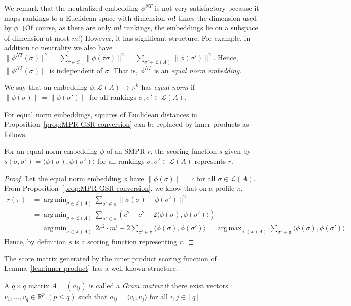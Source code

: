 \documentclass[prodmode]{acmsmall-ec14}
\newcommand{\calL}{{\mathcal{L}}}
\newcommand{\rank}{{\calL(A)}}
\DeclareMathOperator*{\argmax}{arg\,max}
\DeclareMathOperator*{\argmin}{arg\,min}
\newcommand{\nt}{NT}
\begin{document}
%
We remark that the neutralized embedding $\phi^{\nt}$ is not very satisfactory because it maps rankings to a Euclidean space with dimension $m!$ times the dimension used by $\phi$. (Of course, as there are only $m!$ rankings, the embeddings lie on a subspace of dimension at most $m!$)
However, it has significant structure. For example, in addition to neutrality we also have $\|\phi^{\nt}(\sigma)\|^2 = \sum_{\tau \in S_m} \|\phi(\tau \sigma)\|^2 = \sum_{\sigma' \in \rank} \|\phi(\sigma')\|^2$. 
Hence, $\|\phi^{\nt}(\sigma)\|$ is independent of $\sigma$. That is, $\phi^{\nt}$ is an \emph{equal norm embedding}.
%
\begin{definition}
We say that an embedding $\phi : \rank \rightarrow \mathbb{R}^k$ has \emph{equal norm} if $\|\phi(\sigma)\| = \|\phi(\sigma')\|$ for all rankings $\sigma,\sigma' \in \rank$.
\end{definition}
%
For equal norm embeddings, squares of Euclidean distances in Proposition~\ref{prop:MPR-GSR-conversion} can be replaced by inner products as follows.
\begin{lemma}
For an equal norm embedding $\phi$ of an SMPR $r$, the scoring function $s$ given by $s(\sigma,\sigma') = \langle \phi(\sigma),\phi(\sigma') \rangle$ for all rankings $\sigma,\sigma' \in \rank$ represents $r$. 
\label{lem:inner-product}
\end{lemma}
\begin{proof}
Let the equal norm embedding $\phi$ have $\|\phi(\sigma)\| = c$ for all $\sigma \in \rank$. From Proposition~\ref{prop:MPR-GSR-conversion}, we know that on a profile $\pi$, 
\begin{align*}
r(\pi) &= \argmin_{\sigma \in \rank} \sum_{\sigma' \in \pi} \|\phi(\sigma)-\phi(\sigma')\|^2 \\
&= \argmin_{\sigma \in \rank} \sum_{\sigma' \in \pi} \left( c^2 + c^2 - 2 \langle \phi(\sigma), \phi(\sigma')\rangle\right) \\
&= \argmin_{\sigma \in \rank}\: 2 c^2\cdot m! - 2 \sum_{\sigma' \in \pi} \langle \phi(\sigma), \phi(\sigma')\rangle = \argmax_{\sigma \in \rank} \sum_{\sigma' \in \pi} \langle \phi(\sigma), \phi(\sigma')\rangle.
\end{align*}
Hence, by definition $s$ is a scoring function representing $r$. 
\end{proof}
%
The score matrix generated by the inner product scoring function of Lemma~\ref{lem:inner-product} has a well-known structure. 
\begin{definition}
A $q \times q$ matrix $A = (a_{ij})$ is called a \emph{Gram matrix} if there exist vectors $v_1,\ldots,v_q \in \mathbb{R}^p$ $(p \leq q)$ such that $a_{ij} = \langle v_i,v_j \rangle$ for all $i,j \in [q]$.%
\end{definition}
\end{document}
